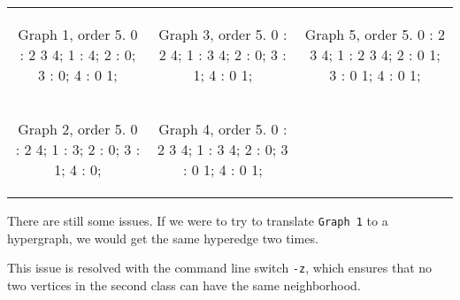 \begin{tabular}{|c|c|c|}

\begin{minipage}{1.5in}
\begin{datalisting}
Graph 1, order 5.
  0 : 2 3 4;
  1 : 4;
  2 : 0;
  3 : 0;
  4 : 0 1;

\end{datalisting}
\end{minipage}

&

\begin{minipage}{1.5in}
\begin{datalisting}
Graph 3, order 5.
  0 : 2 4;
  1 : 3 4;
  2 : 0;
  3 : 1;
  4 : 0 1;

\end{datalisting}
\end{minipage}

&

\begin{minipage}{1.5in}
\begin{datalisting}
Graph 5, order 5.
  0 : 2 3 4;
  1 : 2 3 4;
  2 : 0 1;
  3 : 0 1;
  4 : 0 1;
\end{datalisting}
\end{minipage}


\\

\begin{minipage}{1.5in}
\begin{datalisting}
Graph 2, order 5.
  0 : 2 4;
  1 : 3;
  2 : 0;
  3 : 1;
  4 : 0;

\end{datalisting}
\end{minipage}


&

\begin{minipage}{1.5in}
\begin{datalisting}
Graph 4, order 5.
  0 : 2 3 4;
  1 : 3 4;
  2 : 0;
  3 : 0 1;
  4 : 0 1;

\end{datalisting}
\end{minipage}


&


\\
\end{tabular}


There are still some issues. If we were to try to translate \texttt{Graph 1} to a hypergraph, we would get the same hyperedge two times.

This issue is resolved with the command line switch \texttt{-z}, which ensures that no two vertices in the second class can have the same neighborhood.

